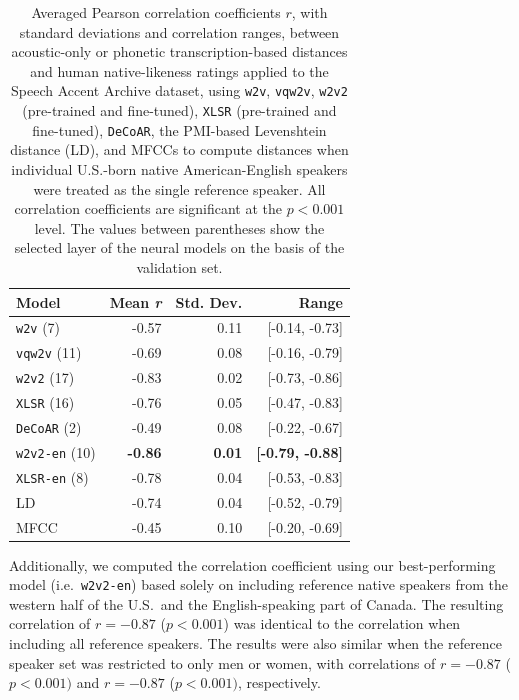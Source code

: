 \documentclass[11pt,a4paper]{article}
\begin{document}
\begin{table}[ht!]
\centering
    \begin{tabular}{lrrr}
      \toprule
      \textbf{Model} &\textbf{Mean \textit{r}} & \textbf{Std. Dev.} & \textbf{Range}\\
      \midrule
      \texttt{w2v} (7) & -0.57 & 0.11 & [-0.14, -0.73]\\
      \texttt{vqw2v} (11) & -0.69 & 0.08 & [-0.16, -0.79]\\
      \texttt{w2v2} (17) & -0.83 & 0.02 & [-0.73, -0.86]\\
      \texttt{XLSR} (16) & -0.76 & 0.05 & [-0.47, -0.83]\\
      \texttt{DeCoAR} (2) & -0.49 & 0.08 & [-0.22, -0.67]\\
      \midrule
      \texttt{w2v2-en} (10) & \textbf{-0.86} & \textbf{0.01} & \textbf{[-0.79, -0.88]}\\
      \texttt{XLSR-en} (8) & -0.78 & 0.04 & [-0.53, -0.83]\\
      \midrule
      LD \citep{wieling2014a} & -0.74 & 0.04 & [-0.52, -0.79]\\
      MFCC \citep{acoustic-measure} & -0.45 & 0.10 & [-0.20, -0.69]\\
      \bottomrule
    \end{tabular}
\caption{Averaged Pearson correlation coefficients $r$, with standard deviations and correlation ranges, between acoustic-only or phonetic transcription-based distances and human native-likeness ratings applied to the Speech Accent Archive dataset, using \texttt{w2v}, \texttt{vqw2v}, \texttt{w2v2} (pre-trained and fine-tuned), \texttt{XLSR} (pre-trained and fine-tuned), \texttt{DeCoAR}, the PMI-based Levenshtein distance (LD), and MFCCs to compute distances when individual U.S.-born native American-English speakers were treated as the single reference speaker. All correlation coefficients are significant at the $p < 0.001$ level. The values between parentheses show the selected layer of the neural models on the basis of the validation set.}
\label{table:singleref}
\end{table}

Additionally, we computed the correlation coefficient using our best-performing model (i.e.~\texttt{w2v2-en}) based solely on including reference native speakers from the western half of the U.S.~and the English-speaking part of Canada. The resulting correlation of $r = -0.87$ ($p < 0.001$) was identical to the correlation when including all reference speakers. The results were also similar when the reference speaker set was restricted to only men or women, with correlations of $r = -0.87$ ($p < 0.001)$ and $r = -0.87$ ($p < 0.001)$, respectively.
\end{document}
